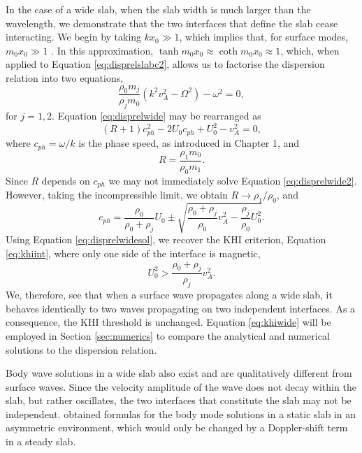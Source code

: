 In the case of a wide slab, when the slab width is much larger than the wavelength, we demonstrate that the two interfaces that define the slab cease interacting.
We begin by taking $k x_0 \gg 1$, which implies that, for surface modes, $m_0 x_0 \gg 1$ \citep[verified by][]{Roberts1981b}.
In this approximation, $\tanh m_0 x_0 \approx \coth m_0 x_0 \approx 1$, which, when applied to Equation \eqref{eq:disprelslabc2}, allows us to factorise the dispersion relation into two equations,
%
\begin{equation}
\label{eq:disprelwide}
\frac{\rho_0 m_j}{\rho_j m_0} \left( k^2 v_A^2 - \Omega^2 \right) - \omega^2 = 0,
\end{equation}
%
for $j=1,2$.
Equation \eqref{eq:disprelwide} may be rearranged as
%
\begin{equation}
\label{eq:disprelwide2}
(R+1) c_{ph}^2 - 2 U_0 c_{ph} + U_0^2 - v_A^2 = 0,
\end{equation}
%
where $c_{ph} = \omega / k$ is the phase speed, as introduced in Chapter 1, and
%
\begin{equation}
\label{eq:Rdef}
R = \frac{\rho_1 m_0}{\rho_0 m_1}.
\end{equation}
%
Since $R$ depends on $c_{ph}$ we may not immediately solve Equation \eqref{eq:disprelwide2}.
However, taking the incompressible limit, we obtain $R \to \rho_1 / \rho_0$, and
%
\begin{equation}
\label{eq:disprelwidesol}
c_{ph} = \frac{\rho_0}{ \rho_0 + \rho_j} U_0
\pm \sqrt{\frac{\rho_0 + \rho_j}{\rho_0} v_A^2
- \frac{\rho_j}{\rho_0} U_0^2}.
\end{equation}
%
Using Equation \eqref{eq:disprelwidesol}, we recover the KHI criterion, Equation \eqref{eq:khiint}, where only one side of the interface is magnetic,
%
\begin{equation}
\label{eq:khiwide}
U_0^2 > \frac{\rho_0 + \rho_j}{\rho_j} v_A^2.
\end{equation}
%
We, therefore, see that when a surface wave propagates along a wide slab, it behaves identically to two waves propagating on two independent interfaces.
As a consequence, the KHI threshold is unchanged.
Equation \eqref{eq:khiwide} will be employed in Section \ref{sec:numerics} to compare the analytical and numerical solutions to the dispersion relation.

Body wave solutions in a wide slab also exist and are qualitatively different from surface waves.
Since the velocity amplitude of the wave does not decay within the slab, but rather oscillates, the two interfaces that constitute the slab may not be independent.
\cite{Allcock2017} obtained formulas for the body mode solutions in a static slab in an asymmetric environment, which would only be changed by a Doppler-shift term in a steady slab.

